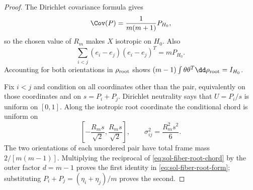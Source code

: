 \documentclass[../main.tex]{subfiles}
\begin{document}
\begin{proof}
The Dirichlet covariance formula gives
\begin{equation}
 \Cov(P)=\frac1{m(m+1)}P_{H_0},
\end{equation}
so the chosen value of $R_m$ makes $X$ isotropic on $H_0$.  Also
\begin{equation}
 \sum_{i<j}(e_i-e_j)(e_i-e_j)^T=mP_{H_0}.
\end{equation}
Accounting for both orientations in $\rho_{\rm root}$ shows
$(m-1)\int\theta\theta^T\dd\rho_{\rm root}=I_{H_0}$.

Fix $i<j$ and condition on all coordinates other than the pair, equivalently on those
coordinates and on $s=P_i+P_j$.  Dirichlet neutrality says that
$U=P_i/s$ is uniform on $[0,1]$.  Along the isotropic root coordinate the conditional chord is
uniform on
\begin{equation}
 \left[-\frac{R_ms}{\sqrt2},\frac{R_ms}{\sqrt2}\right],
 \qquad
 \sigma_{ij}^2=\frac{R_m^2s^2}{6}.
 \label{eq:sol-fiber-root-chord}
\end{equation}
The two orientations of each unordered pair have total frame mass $2/[m(m-1)]$.  Multiplying
the reciprocal of \eqref{eq:sol-fiber-root-chord} by the outer factor $d=m-1$ proves the first
identity in \eqref{eq:sol-fiber-root-form}; substituting $P_i+P_j=(\eta_i+\eta_j)/m$ proves the
second.


\end{proof}
\end{document}
